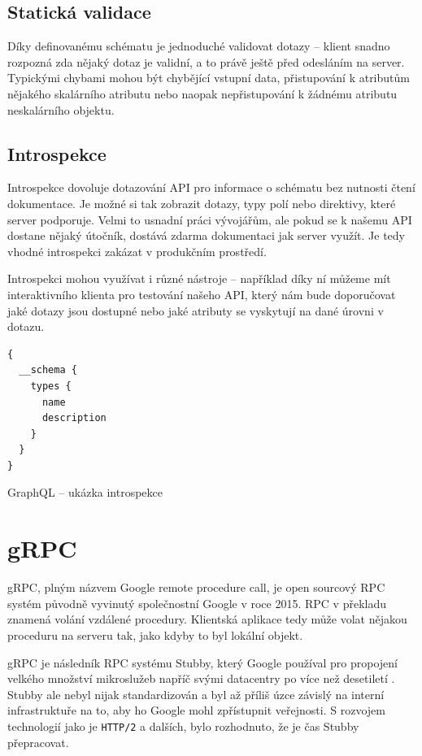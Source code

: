 \documentclass[thesis=M,czech]{FITthesis}[2019/12/23]
\begin{document}
\subsection{Statická validace}
Díky definovanému schématu je jednoduché validovat dotazy -- klient snadno rozpozná zda nějaký dotaz je validní, a to právě ještě před odesláním na server. Typickými chybami mohou být chybějící vstupní data, přistupování k atributům nějakého skalárního atributu nebo naopak nepřistupování k žádnému atributu neskalárního objektu.

\subsection{Introspekce}
\begin{sloppypar}
Introspekce dovoluje dotazování API pro informace o schématu bez nutnosti čtení dokumentace. Je možné si tak zobrazit dotazy, typy polí nebo direktivy, které server podporuje. Velmi to usnadní práci vývojářům, ale pokud se k našemu API dostane nějaký útočník, dostává zdarma dokumentaci jak server využít. Je tedy vhodné introspekci zakázat v produkčním prostředí.
\end{sloppypar}
Introspekci mohou využívat i různé nástroje -- například díky ní můžeme mít interaktivního klienta pro testování našeho API, který nám bude doporučovat jaké dotazy jsou dostupné  nebo jaké atributy se vyskytují na dané úrovni v dotazu.

\begin{listing}[H]
\begin{verbatim}
{
  __schema {
    types {
      name
      description 
    }
  }
}
\end{verbatim}
\caption{GraphQL -- ukázka introspekce}
\label{lst:graphql_introspection}
\end{listing}

\section{gRPC}
gRPC, plným názvem Google remote procedure call, je open sourcový RPC systém původně vyvinutý společnostní Google v roce 2015. RPC v překladu znamená volání vzdálené procedury. Klientská aplikace tedy může volat nějakou proceduru na serveru tak, jako kdyby to byl lokální objekt.

gRPC je následník RPC systému Stubby, který Google používal pro propojení velkého množství mikroslužeb napříč svými datacentry po více než desetiletí \cite{grpc}. Stubby ale nebyl nijak standardizován a byl až příliš úzce závislý na interní infrastruktuře na to, aby ho Google mohl zpřístupnit veřejnosti. S rozvojem technologií jako je \texttt{HTTP/2} a dalších, bylo rozhodnuto, že je čas Stubby přepracovat.
\end{document}
